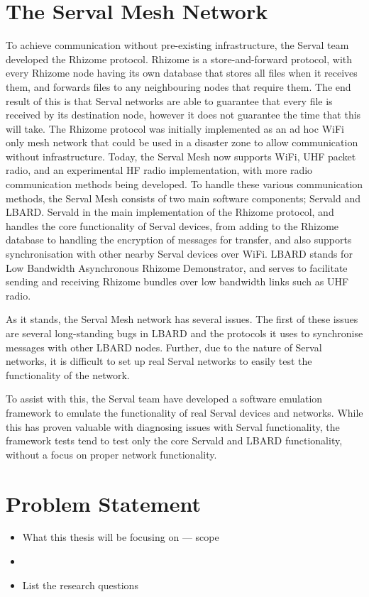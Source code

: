 \section{The Serval Mesh Network}
To achieve communication without pre-existing infrastructure, the Serval team developed the Rhizome protocol.
Rhizome is a store-and-forward protocol, with every Rhizome node having its own database that stores all files when it receives them, and forwards files to any neighbouring nodes that require them.
The end result of this is that Serval networks are able to guarantee that every file is received by its destination node, however it does not guarantee the time that this will take.
The Rhizome protocol was initially implemented as an ad hoc WiFi only mesh network that could be used in a disaster zone to allow communication without infrastructure.
Today, the Serval Mesh now supports WiFi, UHF packet radio, and an experimental HF radio implementation, with more radio communication methods being developed.
To handle these various communication methods, the Serval Mesh consists of two main software components; Servald and LBARD.
Servald in the main implementation of the Rhizome protocol, and handles the core functionality of Serval devices, from adding to the Rhizome database to handling the encryption of messages for transfer, and also supports synchronisation with other nearby Serval devices over WiFi.
LBARD stands for Low Bandwidth Asynchronous Rhizome Demonstrator, and serves to facilitate sending and receiving Rhizome bundles over low bandwidth links such as UHF radio.

As it stands, the Serval Mesh network has several issues.
The first of these issues are several long-standing bugs in LBARD and the protocols it uses to synchronise messages with other LBARD nodes.
Further, due to the nature of Serval networks, it is difficult to set up real Serval networks to easily test the functionality of the network.

To assist with this, the Serval team have developed a software emulation framework to emulate the functionality of real Serval devices and networks.
While this has proven valuable with diagnosing issues with Serval functionality, the framework tests tend to test only the core Servald and LBARD functionality, without a focus on proper network functionality.

\section{Problem Statement}
\begin{itemize}
    \item What this thesis will be focusing on — scope
    \item 
    \item List the research questions
\end{itemize}

